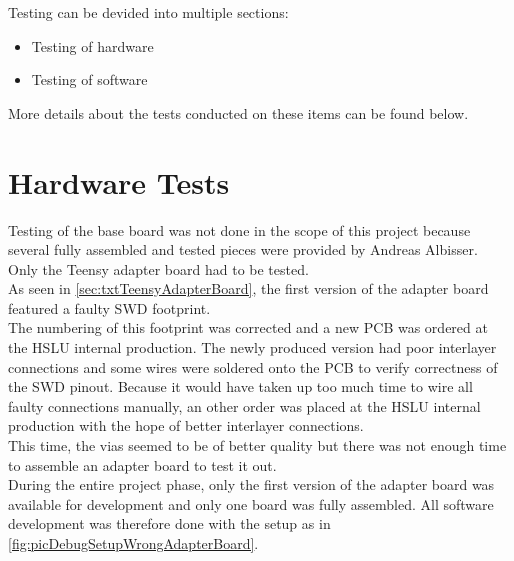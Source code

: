 %
Testing can be devided into multiple sections:
\begin{itemize}
    \item Testing of hardware
    \item Testing of software 
\end{itemize}
More details about the tests conducted on these items can be found below.
%
%
%
%
\section{Hardware Tests} \label{sec:txtHardwareTests}
Testing of the base board was not done in the scope of this project because several fully assembled and tested pieces were provided by Andreas Albisser.\\
Only the Teensy adapter board had to be tested. \\
As seen in \autoref{sec:txtTeensyAdapterBoard}, the first version of the adapter board featured a faulty SWD footprint.\\
The numbering of this footprint was corrected and a new PCB was ordered at the HSLU internal production. The newly produced version had poor interlayer connections and some wires were soldered onto the PCB to verify correctness of the SWD pinout. Because it would have taken up too much time to wire all faulty connections manually, an other order was placed at the HSLU internal production with the hope of better interlayer connections.\\
This time, the vias seemed to be of better quality but there was not enough time to assemble an adapter board to test it out.\\
During the entire project phase, only the first version of the adapter board was available for development and only one board was fully assembled. All software development was therefore done with the setup as in \autoref{fig:picDebugSetupWrongAdapterBoard}.
%
%
%
%
%
